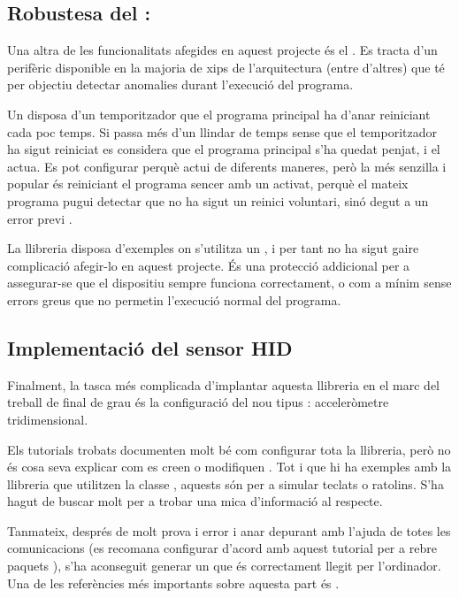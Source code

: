 \subsection{Robustesa del : }

Una altra de les funcionalitats afegides en aquest projecte és el .
Es tracta d'un perifèric disponible en la majoria de xips de l'arquitectura
 (entre d'altres) que té per objectiu detectar anomalies durant
l'execució del programa.

Un  disposa d'un temporitzador que el programa principal ha d'anar
reiniciant cada poc temps. Si passa més d'un llindar de temps sense que el
temporitzador ha sigut reiniciat es considera que el programa principal s'ha
quedat penjat, i el  actua. Es pot configurar perquè actui de
diferents maneres, però la més senzilla i popular és reiniciant el programa
sencer amb un  activat, perquè el mateix programa pugui detectar que
no ha sigut un reinici voluntari, sinó degut a un error previ \cite{Watchdog}.

La llibreria  disposa d'exemples on s'utilitza un , i
per tant no ha sigut gaire complicació afegir-lo en aquest projecte. És una
protecció addicional per a assegurar-se que el dispositiu sempre funciona
correctament, o com a mínim sense errors greus que no permetin l'execució
normal del programa.

\subsection{Implementació del sensor HID}

Finalment, la tasca més complicada d'implantar aquesta llibreria en el marc
del treball de final de grau és la configuració del nou tipus :
acceleròmetre tridimensional.

Els tutorials trobats documenten molt bé com configurar tota la llibreria,
però no és cosa seva explicar com es creen o modifiquen .
Tot i que hi ha exemples amb la llibreria que utilitzen la classe ,
aquests són per a simular teclats o ratolins. S'ha hagut de buscar molt per a
trobar una mica d'informació al respecte.

Tanmateix, després de molt prova i error i anar depurant amb l'ajuda de
 totes les comunicacions (es recomana configurar 
d'acord amb aquest tutorial per a rebre paquets 
\cite{InstallWireshark}), s'ha aconseguit
generar un  que és correctament llegit per l'ordinador.
Una de les referències més importants sobre aquesta part és \cite{VusbProjects}.

